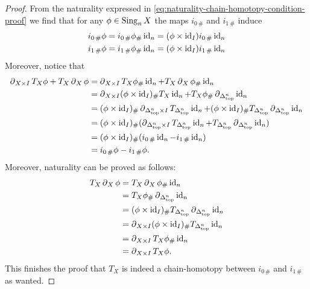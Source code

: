 \begin{proof}
    From the naturality expressed in
    \cref{eq:naturality-chain-homotopy-condition-proof} we find that for any \(\phi
    \in \operatorname{Sing}_n X\) the maps \(i_{0\, \#}\) and \(i_{1\, \#}\) induce
    \begin{align*}
        i_{0\, \#} \phi
         & = i_{0\, \#} \phi_{\#} \operatorname{id}_n
        = (\phi \times \operatorname{id}_I) i_{0\, \#} \operatorname{id}_n \\
        i_{1\, \#} \phi
         & = i_{1\, \#} \phi_{\#} \operatorname{id}_n
        = (\phi \times \operatorname{id}_I) i_{1\, \#} \operatorname{id}_n \\
    \end{align*}
    Moreover, notice that
    \begin{align*}
        \operatorname{\partial}_{X \times I} T_X \phi + T_X \operatorname{\partial}_X \phi
         & = \operatorname{\partial}_{X \times I} T_X \phi_{\#} \operatorname{id}_n
        + T_X \operatorname{\partial}_X \phi_{\#} \operatorname{id}_n                                                   \\
         & = \operatorname{\partial}_{X \times I} (\phi \times \operatorname{id}_I)_{\#} T_X \operatorname{id}_n
        + T_X \phi_{\#} \operatorname{\partial}_{\Delta_{\text{top}}^n} \operatorname{id}_n                                        \\
         & = (\phi \times \operatorname{id}_I)_{\#} \operatorname{\partial}_{\Delta_{\text{top}}^n \times I} T_{\Delta_{\text{top}}^n} \operatorname{id}_n
        + (\phi \times \operatorname{id}_I)_{\#} T_{\Delta_{\text{top}}^n} \operatorname{\partial}_{\Delta_{\text{top}}^n} \operatorname{id}_n              \\
         & = (\phi \times \operatorname{id}_I)_{\#} (\operatorname{\partial}_{\Delta_{\text{top}}^n \times I} T_{\Delta_{\text{top}}^n} \operatorname{id}_n
        + T_{\Delta_{\text{top}}^n} \operatorname{\partial}_{\Delta_{\text{top}}^n} \operatorname{id}_n)                                      \\
         & = (\phi \times \operatorname{id}_I)_{\#} (i_{0\, \#} \operatorname{id}_n - i_{1\, \#} \operatorname{id}_n)             \\
         & = i_{0\, \#} \phi - i_{1\, \#} \phi.
    \end{align*}
    Moreover, naturality can be proved as follows:
    \begin{align*}
        T_X \operatorname{\partial}_X \phi
         & = T_X \operatorname{\partial}_X \phi_{\#} \operatorname{id}_n                                      \\
         & = T_X \phi_{\#} \operatorname{\partial}_{\Delta_{\text{top}}^n} \operatorname{id}_n                           \\
         & = (\phi \times \operatorname{id}_I)_{\#} T_{\Delta_{\text{top}}^n} \operatorname{\partial}_{\Delta_{\text{top}}^n} \operatorname{id}_n \\
         & = \operatorname{\partial}_{X \times I} (\phi \times \operatorname{id}_I)_{\#} T_{\Delta_{\text{top}}^n} \operatorname{id}_n \\
         & = \operatorname{\partial}_{X \times I} T_X \phi_{\#} \operatorname{id}_n                           \\
         & = \operatorname{\partial}_{X \times I} T_X \phi.
    \end{align*}
    This finishes the proof that \(T_X\) is indeed a chain-homotopy between
    \(i_{0\, \#}\) and \(i_{1\, \#}\) as wanted.
\end{proof}

